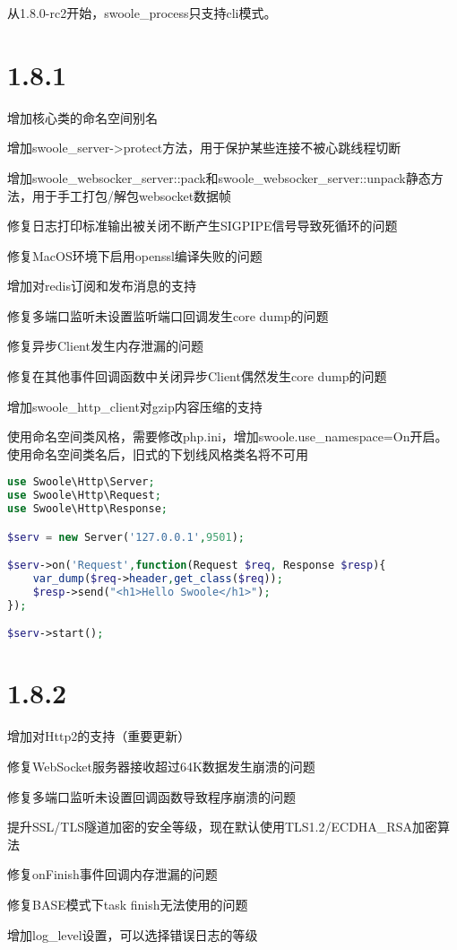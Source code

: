 从1.8.0-rc2开始，swoole\_process只支持cli模式。

\section{1.8.1}


\begin{compactitem}
\item 增加核心类的命名空间别名
\item 增加swoole\_server->protect方法，用于保护某些连接不被心跳线程切断
\item 增加swoole\_websocker\_server::pack和swoole\_websocker\_server::unpack静态方法，用于手工打包/解包websocket数据帧
\item 修复日志打印标准输出被关闭不断产生SIGPIPE信号导致死循环的问题
\item 修复MacOS环境下启用openssl编译失败的问题
\item 增加对redis订阅和发布消息的支持
\item 修复多端口监听未设置监听端口回调发生core dump的问题
\item 修复异步Client发生内存泄漏的问题
\item 修复在其他事件回调函数中关闭异步Client偶然发生core dump的问题
\item 增加swoole\_http\_client对gzip内容压缩的支持
\end{compactitem}


使用命名空间类风格，需要修改php.ini，增加swoole.use\_namespace=On开启。使用命名空间类名后，旧式的下划线风格类名将不可用


\begin{lstlisting}[language=PHP]
use Swoole\Http\Server;
use Swoole\Http\Request;
use Swoole\Http\Response;

$serv = new Server('127.0.0.1',9501);

$serv->on('Request',function(Request $req, Response $resp){
    var_dump($req->header,get_class($req));
    $resp->send("<h1>Hello Swoole</h1>");
});

$serv->start();
\end{lstlisting}


\section{1.8.2}


\begin{compactitem}
\item 增加对Http2的支持（重要更新）
\item 修复WebSocket服务器接收超过64K数据发生崩溃的问题
\item 修复多端口监听未设置回调函数导致程序崩溃的问题
\item 提升SSL/TLS隧道加密的安全等级，现在默认使用TLS1.2/ECDHA_RSA加密算法
\item 修复onFinish事件回调内存泄漏的问题
\item 修复BASE模式下task finish无法使用的问题
\item 增加log\_level设置，可以选择错误日志的等级
\end{compactitem}


